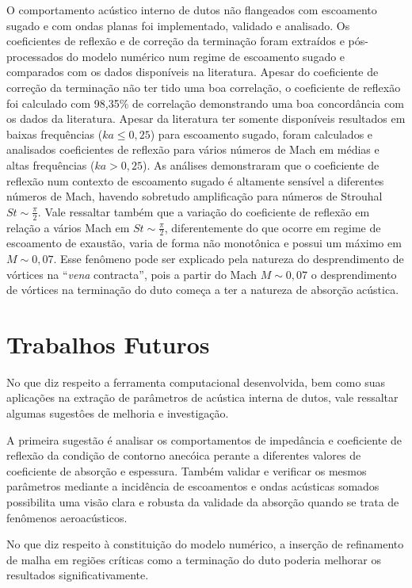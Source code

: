 O comportamento acústico interno de dutos não flangeados com escoamento sugado e com ondas planas foi implementado, validado e analisado. Os coeficientes de reflexão e de correção da terminação foram extraídos e pós-processados do modelo numérico num regime de escoamento sugado e comparados com os dados disponíveis na literatura. Apesar do coeficiente de correção da terminação não ter tido uma boa correlação, o coeficiente de reflexão foi calculado com 98,35\% de correlação demonstrando uma boa concordância com os dados da literatura. Apesar da literatura ter somente disponíveis resultados em baixas frequências ($ka \leq 0,25$) para escoamento sugado, foram calculados e analisados coeficientes de reflexão para vários números de Mach em médias e altas frequências ($ka > 0,25$). As análises demonstraram que o coeficiente de reflexão num contexto de escoamento sugado é altamente sensível a diferentes números de Mach, havendo sobretudo amplificação para números de Strouhal $St \sim \frac{\pi}{2}$. Vale ressaltar também que a variação do coeficiente de reflexão em relação a vários Mach em $St \sim \frac{\pi}{2}$, diferentemente do que ocorre em regime de escoamento de exaustão, varia de forma não monotônica e possui um máximo em $M \sim 0,07$. Esse fenômeno pode ser explicado pela natureza do desprendimento de vórtices na ``\textit{vena} contracta'', pois a partir do Mach $M \sim 0,07$ o desprendimento de vórtices na terminação do duto começa a ter a natureza de absorção acústica.

\section{Trabalhos Futuros}

No que diz respeito a ferramenta computacional desenvolvida, bem como suas aplicações na extração de parâmetros de acústica interna de dutos, vale ressaltar algumas sugestôes de melhoria e investigação.

A primeira sugestão é analisar os comportamentos de impedância e coeficiente de reflexão da condição de contorno anecóica perante a diferentes valores de coeficiente de absorção e espessura. Também validar e verificar os mesmos parâmetros mediante a incidência de escoamentos e ondas acústicas somados possibilita uma visão clara e robusta da validade da absorção quando se trata de fenômenos aeroacústicos.

No que diz respeito à constituição do modelo numérico, a inserção de refinamento de malha em regiões críticas como a terminação do duto poderia melhorar os resultados significativamente.

